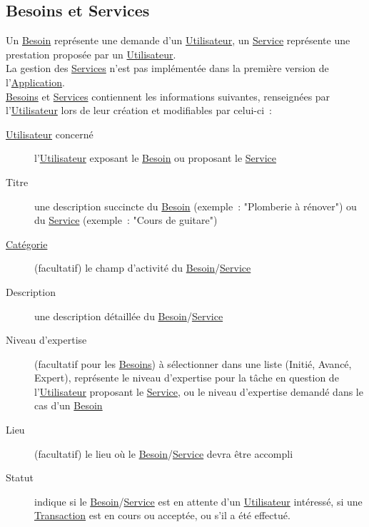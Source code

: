 \documentclass[french,12pt]{article}
\begin{document}
		\newpage
		\subsection{Besoins et Services}
			Un \hyperlink{besoin}{Besoin} représente une demande d’un
			 \hyperlink{utilisateur}{Utilisateur}, un \hyperlink{service}{Service}
			 représente une prestation proposée par un
			 \hyperlink{utilisateur}{Utilisateur}.\\

			La gestion des \hyperlink{service}{Services} n’est pas implémentée dans la
			 première version de l’\hyperlink{application}{Application}.\\

			\hyperlink{besoin}{Besoins} et \hyperlink{service}{Services} contiennent
			 les informations suivantes, renseignées par
			 l’\hyperlink{utilisateur}{Utilisateur} lors de leur création et
			 modifiables par celui-ci :
			\begin{description}
				\item [\hyperlink{utilisateur}{Utilisateur} concerné]
					l’\hyperlink{utilisateur}{Utilisateur} exposant le
					 \hyperlink{besoin}{Besoin} ou proposant le
					 \hyperlink{service}{Service}
				\item [Titre]
					une description succincte du \hyperlink{besoin}{Besoin} (exemple :
					 "Plomberie à rénover") ou du \hyperlink{service}{Service} (exemple :
					 "Cours de guitare")
				\item [\hyperlink{categorie}{Catégorie}]
					(facultatif) le champ d’activité du
					 \hyperlink{besoin}{Besoin}/\hyperlink{service}{Service}
				\item [Description]
					une description détaillée du
					 \hyperlink{besoin}{Besoin}/\hyperlink{service}{Service}
				\item [Niveau d’expertise]
					(facultatif pour les \hyperlink{besoin}{Besoins}) à sélectionner dans
					 une liste (Initié, Avancé, Expert), représente le niveau d’expertise
					 pour la tâche en question de l’\hyperlink{utilisateur}{Utilisateur}
					 proposant le \hyperlink{service}{Service}, ou le niveau d’expertise
					 demandé dans le cas d’un \hyperlink{besoin}{Besoin}
				\item [Lieu]
					(facultatif) le lieu où le
					 \hyperlink{besoin}{Besoin}/\hyperlink{service}{Service} devra être
					 accompli
				\item [Statut]
					indique si le \hyperlink{besoin}{Besoin}/\hyperlink{service}{Service}
					 est en attente d’un \hyperlink{utilisateur}{Utilisateur} intéressé,
					 si une \hyperlink{transaction}{Transaction} est en cours ou acceptée,
					 ou s’il a été effectué.
			\end{description}
\end{document}
